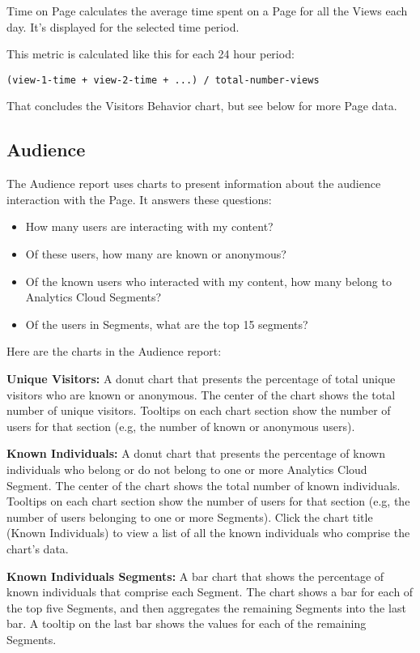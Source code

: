 Time on Page calculates the average time spent on a Page for all the
Views each day. It's displayed for the selected time period.

This metric is calculated like this for each 24 hour period:

\begin{verbatim}
(view-1-time + view-2-time + ...) / total-number-views
\end{verbatim}

That concludes the Visitors Behavior chart, but see below for more Page
data.

\subsection{Audience}\label{audience}

The Audience report uses charts to present information about the
audience interaction with the Page. It answers these questions:

\begin{itemize}
\tightlist
\item
  How many users are interacting with my content?
\item
  Of these users, how many are known or anonymous?
\item
  Of the known users who interacted with my content, how many belong to
  Analytics Cloud Segments?
\item
  Of the users in Segments, what are the top 15 segments?
\end{itemize}

Here are the charts in the Audience report:

\textbf{Unique Visitors:} A donut chart that presents the percentage of
total unique visitors who are known or anonymous. The center of the
chart shows the total number of unique visitors. Tooltips on each chart
section show the number of users for that section (e.g, the number of
known or anonymous users).

\textbf{Known Individuals:} A donut chart that presents the percentage
of known individuals who belong or do not belong to one or more
Analytics Cloud Segment. The center of the chart shows the total number
of known individuals. Tooltips on each chart section show the number of
users for that section (e.g, the number of users belonging to one or
more Segments). Click the chart title (Known Individuals) to view a list
of all the known individuals who comprise the chart's data.

\textbf{Known Individuals Segments:} A bar chart that shows the
percentage of known individuals that comprise each Segment. The chart
shows a bar for each of the top five Segments, and then aggregates the
remaining Segments into the last bar. A tooltip on the last bar shows
the values for each of the remaining Segments.

